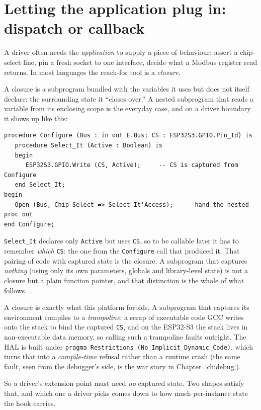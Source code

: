 \section{Letting the application plug in: dispatch or callback}
\label{driver:plugin}

A driver often needs the \emph{application} to supply a piece of behaviour: assert
a chip-select line, pin a fresh socket to one interface, decide what a Modbus
register read returns. In most languages the reach-for tool is a \emph{closure}.

A closure is a subprogram bundled with the variables it uses but does not itself
declare: the surrounding state it ``closes over.'' A nested subprogram that reads
a variable from its enclosing scope is the everyday case, and on a driver boundary
it shows up like this:

\begin{lstlisting}
procedure Configure (Bus : in out E.Bus; CS : ESP32S3.GPIO.Pin_Id) is
   procedure Select_It (Active : Boolean) is
   begin
      ESP32S3.GPIO.Write (CS, Active);     -- CS is captured from Configure
   end Select_It;
begin
   Open (Bus, Chip_Select => Select_It'Access);   -- hand the nested proc out
end Configure;
\end{lstlisting}

\texttt{Select\_It} declares only \texttt{Active} but uses \texttt{CS}, so to be
callable later it has to remember \emph{which} \texttt{CS}: the one from the
\texttt{Configure} call that produced it. That pairing of code with captured state
is the closure. A subprogram that captures \emph{nothing} (using only its own
parameters, globals and library-level state) is not a closure but a plain
function pointer, and that distinction is the whole of what follows.

A closure is exactly what this platform forbids. A subprogram that captures its
environment compiles to a \emph{trampoline}: a scrap of executable code GCC
writes onto the stack to bind the captured \texttt{CS}, and on the ESP32-S3 the
stack lives in non-executable data memory, so calling such a trampoline faults
outright. The HAL is built under
\texttt{pragma Restrictions (No\_Implicit\_Dynamic\_Code)}, which turns that into a
\emph{compile-time} refusal rather than a runtime crash (the same fault, seen from
the debugger's side, is the war story in Chapter~\ref{ch:debug}).

So a driver's extension point must need \emph{no} captured state. Two shapes
satisfy that, and which one a driver picks comes down to how much per-instance
state the hook carries.


